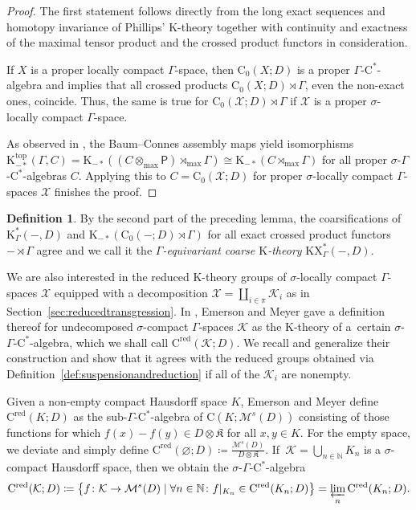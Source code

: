 \documentclass[pdftex]{sigma}
\numberwithin{equation}{section}
\theoremstyle{definition}
\newtheorem{defn}[thm]{Definition}
\newcommand{\N}{\mathbb{N}}
\newcommand{\cX}{\mathcal{X}}
\newcommand{\cK}{\mathcal{K}}
\newcommand{\Ct}{\mathrm{C}}
\newcommand{\Cz}{\Ct_0}
\newcommand{\CRed}{\Ct^{\mathrm{red}}}
\newcommand{\maxtensor}{\mathbin{{\otimes}_{\mathrm{max}}}}
\newcommand{\maxcrossed}{\mathbin{{\rtimes}_{\mathrm{max}}}}
\newcommand{\KX}{\mathrm{KX}}
\newcommand{\K}{\mathrm{K}}
\newcommand{\Ktop}{\mathrm{K}^{\mathrm{top}}}
\newcommand{\textCstar}{\ensuremath{\mathrm{C}^*\!}}
\newcommand{\Kom}{{\mathfrak{K}}}
\newcommand{\multiplier}{{\mathcal{M}}}
\newcommand{\sfP}{\mathsf{P}}
\newcommand{\blank}{-}
\begin{document}
\begin{proof}The first statement follows directly from the long exact sequences and homotopy invariance of Phillips' $\K$-theory together with continuity and exactness of the maximal tensor product and the crossed product functors in consideration.

If $X$ is a proper locally compact $\Gamma$-space, then $\Cz(X;D)$ is a proper $\Gamma$-\textCstar-algebra and \cite[Remark~3.4.16]{echterhoff_KK_BC_overview} implies that all crossed products $\Cz(X;D)\rtimes\Gamma$, even the non-exact ones, coincide. Thus, the same is true for $\Cz(\cX;D)\rtimes \Gamma$ if $\cX$ is a proper $\sigma$-locally compact $\Gamma$-space.

As observed in \cite[Section~2.7]{EmeMeyDescent}, the Baum--Connes assembly maps yield isomorphisms \linebreak$\Ktop_{-*}(\Gamma,C)=\K_{-*}((C\maxtensor\sfP)\maxcrossed\Gamma)\cong\K_{-*}(C\maxcrossed\Gamma)$ for all proper $\sigma$-$\Gamma$-\textCstar-algebras $C$. Applying this to $C=\Cz(\cX;D)$ for proper $\sigma$-locally compact $\Gamma$-spaces $\cX$ finishes the proof.
\end{proof}

\begin{defn}By the second part of the preceding lemma, the coarsifications of $\K_\Gamma^*(\blank,D)$ and $\K_{-*}(\Cz(\blank;D)\rtimes\Gamma)$ for all exact crossed product functors $\blank\rtimes\Gamma$ agree and we call it the \emph{$\Gamma$-equivariant coarse $\K$-theory} $\KX_\Gamma^*(\blank,D)$.
\end{defn}

We are also interested in the reduced $\K$-theory groups of $\sigma$-locally compact $\Gamma$-spaces $\cX$ equipped with a decomposition $\cX=\coprod_{i\in \pi}\cK_i$ as in Section~\ref{sec:reducedtransgression}. In \cite[Section~2.3]{EmeMeyEquivariantCoassembly}, Emerson and Meyer gave a definition thereof for undecomposed $\sigma$-compact $\Gamma$-spaces $\cK$ as the $\K$-theory of a~certain $\sigma$-$\Gamma$-\textCstar-algebra, which we shall call $\CRed(\cK;D)$. We recall and generalize their construction and show that it agrees with the reduced groups obtained via Definition~\ref{def:suspensionandreduction} if all of the $\cK_i$ are nonempty.

Given a non-empty compact Hausdorff space $K$, Emerson and Meyer define $\CRed(K;D)$ as the sub-$\Gamma$-\textCstar-algebra of $\Ct(K;\multiplier^s(D))$ consisting of those functions for which $f(x)-f(y)\in D\otimes\Kom$ for all $x,y\in K$.
For the empty space, we deviate and simply define $\CRed(\varnothing;D)\coloneqq\frac{\multiplier^s(D)}{D\otimes\Kom}$.
If~$\cK=\bigcup_{n\in\N}K_n$ is a $\sigma$-compact Hausdorff space, then we obtain the $\sigma$-$\Gamma$-\textCstar-algebra
\[
\CRed(\cK;D)\coloneqq\big\{f\colon\cK\to \multiplier^s(D)\mid \forall n\in\N\colon f|_{K_n}\in\CRed(K_n;D)\big\}=\varprojlim_{n}\CRed(K_n;D).
\]
\end{document}
